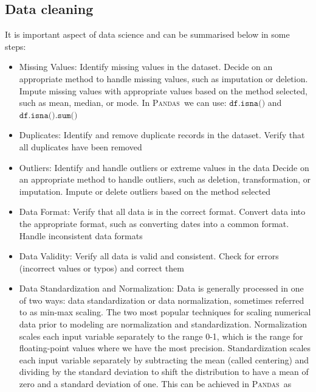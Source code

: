 \documentclass[11pt]{article}
\newcommand{\PAD}{\textsc{Pandas}}
\begin{document}
\subsection{Data cleaning}

It is important aspect of data science and can be summarised below in some steps:

\begin{itemize}
\item Missing Values: Identify missing values in the dataset. Decide on an appropriate method to handle missing values, such as imputation or deletion. Impute missing values with appropriate values based on the method selected, such as mean, median, or mode. 
In \PAD~we can use: $\texttt{df.isna()}$ and $\texttt{df.isna().sum()}$

\begin{mdframed}[backgroundcolor=celadon!6]

\end{mdframed}



\item Duplicates: Identify and remove duplicate records in the dataset. Verify that all duplicates have been removed
\item Outliers: Identify and handle outliers or extreme values in the data Decide on an appropriate method to handle outliers, such as deletion, transformation, or imputation. Impute or delete outliers based on the method selected
\item Data Format: Verify that all data is in the correct format. Convert data into the appropriate format, such as converting dates into a common format. Handle inconsistent data formats\
\item Data Validity: Verify all data is valid and consistent. Check for errors (incorrect values or typos) and correct them
\item Data Standardization and Normalization: Data is generally processed in one of two ways:  data standardization or data normalization, sometimes referred to as min-max scaling. The two most popular techniques for scaling numerical data prior to modeling are normalization and standardization. Normalization scales each input variable separately to the range 0-1, which is the range for floating-point values where we have the most precision. Standardization scales each input variable separately by subtracting the mean (called centering) and dividing by the standard deviation to shift the distribution to have a mean of zero and a standard deviation of one. This can be achieved in \PAD~as 
\end{itemize}
\end{document}
